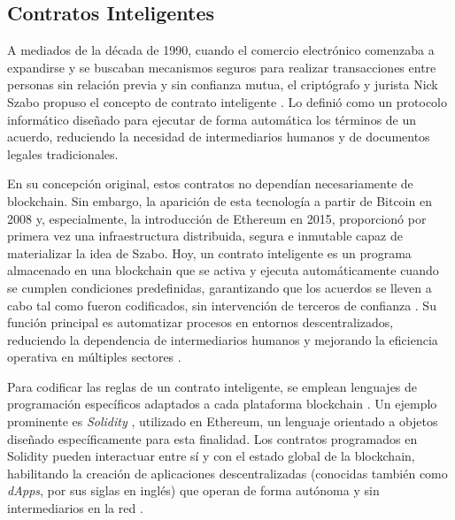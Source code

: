 \subsection{Contratos Inteligentes}
\label{sec:smart-contracts}

A mediados de la década de 1990, cuando el comercio electrónico comenzaba a expandirse y se buscaban mecanismos seguros para realizar transacciones entre personas sin relación previa y sin confianza mutua, el criptógrafo y jurista Nick Szabo propuso el concepto de contrato inteligente \cite{pending}. Lo definió como un protocolo informático diseñado para ejecutar de forma automática los términos de un acuerdo, reduciendo la necesidad de intermediarios humanos y de documentos legales tradicionales.

En su concepción original, estos contratos no dependían necesariamente de blockchain. Sin embargo, la aparición de esta tecnología a partir de Bitcoin en 2008 y, especialmente, la introducción de Ethereum en 2015, proporcionó por primera vez una infraestructura distribuida, segura e inmutable capaz de materializar la idea de Szabo. Hoy, un contrato inteligente es un programa almacenado en una blockchain que se activa y ejecuta automáticamente cuando se cumplen condiciones predefinidas, garantizando que los acuerdos se lleven a cabo tal como fueron codificados, sin intervención de terceros de confianza \cite{bulkowska2023implementation}. Su función principal es automatizar procesos en entornos descentralizados, reduciendo la dependencia de intermediarios humanos \cite{verma2023overview} y mejorando la eficiencia operativa en múltiples sectores \cite{sunny2022systematic}.

Para codificar las reglas de un contrato inteligente, se emplean lenguajes de programación específicos adaptados a cada plataforma blockchain \cite{bartolomeo2020introduccion}. Un ejemplo prominente es \textit{Solidity} \cite{taherdoost2023smart}, utilizado en Ethereum, un lenguaje orientado a objetos diseñado específicamente para esta finalidad. Los contratos programados en Solidity pueden interactuar entre sí y con el estado global de la blockchain, habilitando la creación de aplicaciones descentralizadas (conocidas también como \textit{dApps}, por sus siglas en inglés) que operan de forma autónoma y sin intermediarios en la red \cite{buterin2013ethereum}.


